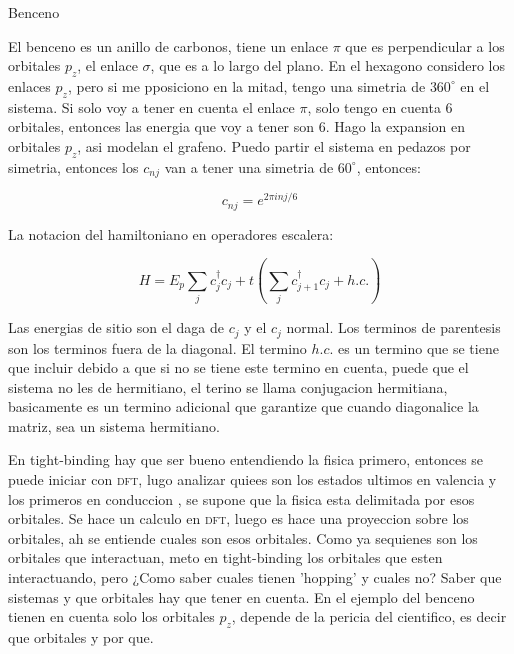 \documentclass[11pt,fleqn]{book}
\begin{document}
\begin{example}{Benceno}

El benceno es un anillo de carbonos, tiene un enlace $\pi$ que es perpendicular a los orbitales $p_{z}$, el enlace $\sigma$, que es a lo largo del plano. En el hexagono considero los enlaces $p_{z} $, pero si me pposiciono en la mitad, tengo una simetria de $360^{\circ}$ en el sistema. Si solo voy a tener en cuenta el enlace $\pi$, solo tengo en cuenta 6 orbitales, entonces las energia que voy a tener son $6$. Hago la expansion en orbitales $p_{z}$, asi modelan el grafeno. Puedo partir el sistema en pedazos por simetria, entonces los $c_{nj}$ van a tener una simetria de $60^{\circ}$, entonces:

\begin{equation*}
    c_{nj}=e^{2\pi inj/6}
\end{equation*}
\end{example}

La notacion del hamiltoniano en operadores escalera:

\begin{equation}
    H=E_{p}\sum_{j}c_{j}^{\dag}c_{j}+t\left(\sum_{j}c_{j+1}^{\dag}c_{j}+h.c.\right)
\end{equation}

Las energias de sitio son el daga de $c_{j}$ y el $c_{j}$ normal. Los terminos de parentesis son los terminos fuera de la diagonal. El termino $h.c.$ es un termino que se tiene que incluir debido a que si no se tiene este termino en cuenta, puede que el sistema no les de hermitiano, el terino se llama  conjugacion hermitiana, basicamente es un termino adicional que garantize que cuando diagonalice la matriz, sea un sistema hermitiano.

En tight-binding hay que ser bueno entendiendo la fisica primero, entonces se puede iniciar con \textsc{dft}, lugo analizar quiees son los estados ultimos en valencia y los primeros en conduccion , se supone que la fisica esta delimitada por esos orbitales. Se hace un calculo en \textsc{dft}, luego es hace una proyeccion sobre los orbitales, ah se entiende cuales son esos orbitales. Como ya sequienes son los orbitales que interactuan, meto en tight-binding los orbitales que esten interactuando, pero ¿Como saber cuales tienen 'hopping' y cuales no? Saber que sistemas y que orbitales hay que tener en cuenta. En el ejemplo del benceno tienen en cuenta solo los orbitales $p_{z}$, depende de la pericia del cientifico, es decir que orbitales y por que. 
\end{document}
